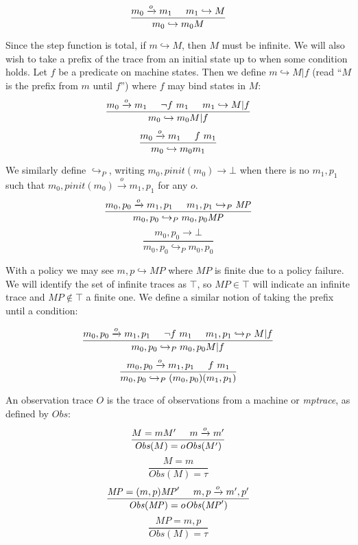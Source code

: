 \documentclass[conference]{IEEEtran}
\newcommand{\MP}{\mathit{MP}}
\begin{document}
    \[\frac{m_0 \xrightarrow{o} m_1 \hspace{.5cm} m_1 \hookrightarrow M}
           {m_0 \hookrightarrow m_0 M}\]

    Since the step function is total, if \(m \hookrightarrow M\), then \(M\) must be infinite.
    We will also wish to take a prefix of the trace from an initial state up to when some condition
    holds. Let \(f\) be a predicate on machine states. Then we define \(m \hookrightarrow M | f\)
    (read ``\(M\) is the prefix from \(m\) until \(f\)'') where \(f\) may bind states in \(M\):
    \[\frac{m_0 \xrightarrow{o} m_1 \hspace{.5cm} \neg f\ m_1 \hspace{.5cm} m_1 \hookrightarrow M | f }
           {m_0 \hookrightarrow m_0 M | f}\]
    \[\frac{m_0 \xrightarrow{o} m_1 \hspace{.5cm} f\ m_1}
           {m_0 \hookrightarrow m_0 m_1}\]

    We similarly define \(\hookrightarrow_P\), writing \(m_0,\mathit{pinit}(m_0) \longrightarrow \bot\) when
    there is no \(m_1,p_1\) such that \(m_0,\mathit{pinit}(m_0) \xrightarrow{o} m_1,p_1\) for any \(o\).
    \[\frac{m_0,p_0 \xrightarrow{o} m_1,p_1 \hspace{.5cm} m_1,p_1 \hookrightarrow_P \MP}
           {m_0,p_0 \hookrightarrow_P m_0,p_0 \MP}\]
    \[\frac{m_0,p_0 \longrightarrow \bot}
           {m_0,p_0 \hookrightarrow_P m_0,p_0}\]

    With a policy we may see \(m,p \hookrightarrow \MP\) where \(\MP\) is finite due to a policy
    failure. We will identify the set of infinite traces as \(\top\), so \(\MP \in \top\) will
    indicate an infinite trace and \(\MP \not \in \top\) a finite one.
    We define a similar notion of taking the prefix until a condition:

    \[\frac{m_0,p_0 \xrightarrow{o} m_1,p_1 \hspace{.5cm} \neg f\ m_1 \hspace{.5cm} m_1,p_1
              \hookrightarrow_P M | f }
           {m_0,p_0 \hookrightarrow_P m_0,p_0 M | f}\]
    \[\frac{m_0,p_0 \xrightarrow{o} m_1,p_1 \hspace{.5cm} f\ m_1}
           {m_0,p_0 \hookrightarrow_P (m_0,p_0) (m_1,p_1)}\]

    An observation trace \(O\) is the trace of observations from a machine or {\it mptrace},
    as defined by \(\mathit{Obs}\):
    \[\frac{M = mM' \hspace{.5cm} m \xrightarrow{o} m'}
           {\mathit{Obs}(M) = o\mathit{Obs}(M')}\]
    \[\frac{M = m}
           {\mathit{Obs}(M) = \tau}\]
    \[\frac{\MP = (m,p)\MP' \hspace{.5cm} m,p \xrightarrow{o} m',p'}
           {\mathit{Obs}(\MP) = o \mathit{Obs}(\MP')}\]
    \[\frac{\MP = m,p}
           {\mathit{Obs}(M) = \tau}\]
\end{document}
